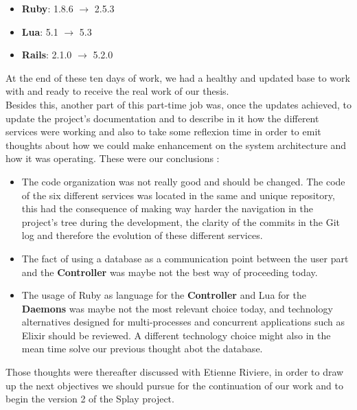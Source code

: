 \documentclass{eplmastersthesis}
\begin{document}
      \begin{itemize}
        \item \textbf{Ruby}: 1.8.6 $\rightarrow$ 2.5.3
        \item \textbf{Lua}: 5.1 $\rightarrow$ 5.3
        \item \textbf{Rails}: 2.1.0 $\rightarrow$ 5.2.0
      \end{itemize}

      At the end of these ten days of work, we had a healthy and updated
      base to work with and ready to receive the real work of our thesis.\\

      Besides this, another part of this part-time job was, once the updates
      achieved, to update the project's documentation and to describe in
      it how the different services were working and also to take some
      reflexion time in order to emit thoughts about how we could make
      enhancement on the system architecture and how it was operating. These
      were our conclusions :

      \begin{itemize}
        \item The code organization was not really good and should be changed.
        The code of the six different services was located in the same and
        unique repository, this had the consequence of making way harder
        the navigation in the project's tree during the development, the
        clarity of the commits in the Git log and therefore the evolution
        of these different services.
        \item The fact of using a database as a communication point between
        the user part and the \textbf{Controller} was maybe not the best
        way of proceeding today.
        \item The usage of Ruby as language for the \textbf{Controller} and
        Lua for the \textbf{Daemons} was maybe not the most relevant choice
        today, and technology alternatives designed for multi-processes and
        concurrent applications such as Elixir should be reviewed. A different
        technology choice might also in the mean time solve our previous
        thought abot the database.
      \end{itemize}

      Those thoughts were thereafter discussed with Etienne Riviere, in order
      to draw up the next objectives we should pursue for the continuation
      of our work and to begin the version 2 of the Splay project.
\end{document}

